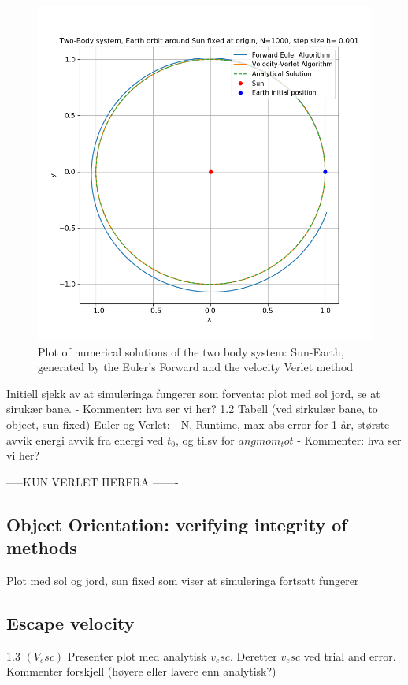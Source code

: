 \documentclass[%
oneside,                 %
final,                   %
10pt]{article}
\begin{document}
\begin{figure}[!htb]
        \centering 
         \includegraphics[scale=.6]{../Results/twoBodyNOOplot1.png} 
        \caption{Plot of numerical solutions of the two body system: Sun-Earth, generated by the Euler's Forward and the velocity Verlet method}
        \label{fig:twobodyplot}   
\end{figure}  

 Initiell sjekk av at simuleringa fungerer som forventa: plot med sol jord, se at sirukær bane. 
    - Kommenter: hva ser vi her?
1.2 Tabell (ved sirkulær bane, to object, sun fixed) Euler og Verlet:
    - N, Runtime, max abs error for 1 år, største avvik energi avvik fra energi ved $t_0$, og tilsv for $angmom_tot $
    - Kommenter: hva ser vi her?
    
 -----KUN VERLET HERFRA -------

\subsection{Object Orientation: verifying integrity of methods} Plot med sol og jord, sun fixed som viser at simuleringa fortsatt fungerer
 
\subsection{Escape velocity}
1.3 $(V_esc)$ Presenter plot med analytisk $v_esc.$ Deretter $v_esc$ ved trial and error. Kommenter forskjell (høyere eller lavere enn analytisk?)
\end{document}
